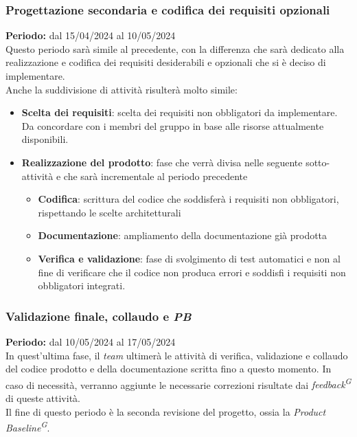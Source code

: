 \documentclass[5pt]{article}
\begin{document}
    \subsubsection{Progettazione secondaria e codifica dei requisiti opzionali}
      \textbf{Periodo:} dal 15/04/2024 al 10/05/2024 
      \vspace{0.3cm} \\
      Questo periodo sarà simile al precedente, con la differenza che sarà dedicato alla realizzazione e codifica dei requisiti desiderabili e opzionali 
      che si è deciso di implementare. \\
      Anche la suddivisione di attività risulterà molto simile:
      \begin{itemize}
        \item \textbf{Scelta dei requisiti}: scelta dei requisiti non obbligatori da implementare. Da concordare con i membri del gruppo in base alle risorse attualmente disponibili.
        \item \textbf{Realizzazione del prodotto}: fase che verrà divisa nelle seguente sotto-attività e che sarà incrementale al periodo precedente
        \begin{itemize}
          \item \textbf{Codifica}: scrittura del codice che soddisferà i requisiti non obbligatori, rispettando le scelte architetturali
          \item \textbf{Documentazione}: ampliamento della documentazione già prodotta
          \item \textbf{Verifica e validazione}: fase di svolgimento di test automatici e non al fine di verificare che il codice non produca errori e soddisfi i requisiti non obbligatori integrati.
        \end{itemize}  
      \end{itemize}
    
    \subsubsection{Validazione finale, collaudo e \textit{PB}}
      \textbf{Periodo:} dal 10/05/2024 al 17/05/2024 
      \vspace{0.3cm} \\
      In quest'ultima fase, il \textit{team} ultimerà le attività di verifica, validazione e collaudo del codice prodotto e della documentazione scritta fino a questo momento.
      In caso di necessità, verranno aggiunte le necessarie correzioni risultate dai \textit{feedback\textsuperscript{G}} di queste attività. \\
      Il fine di questo periodo è la seconda revisione del progetto, ossia la \textit{Product Baseline\textsuperscript{G}}.
\end{document}
